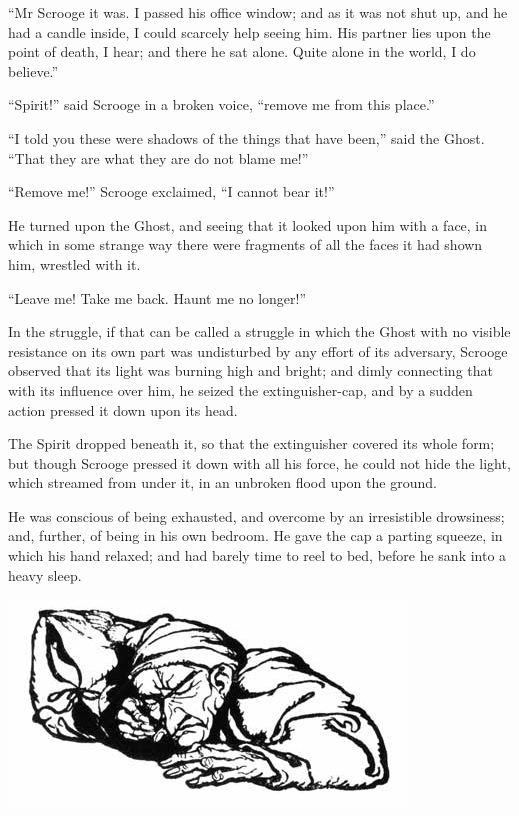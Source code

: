 \documentclass[paper=5.5in:8.5in,BCOR=10mm,twoside,DIV=15,12pt,usegeometry,openany]{scrbook} %
\begin{document}
\enquote{Mr Scrooge it was. I passed his office window; and as it was not shut up, and he had a candle inside, I could scarcely help seeing him. His partner lies upon the point of death, I hear; and there he sat alone. Quite alone in the world, I do believe.}

\enquote{Spirit!} said Scrooge in a broken voice, \enquote{remove me from this place.}

\enquote{I told you these were shadows of the things that have been,} said the Ghost. \enquote{That they are what they are do not blame me!}

\enquote{Remove me!} Scrooge exclaimed, \enquote{I cannot bear it!}

He turned upon the Ghost, and seeing that it looked upon him with a face, in which in some strange way there were fragments of all the faces it had shown him, wrestled with it.

\enquote{Leave me! Take me back. Haunt me no longer!}

In the struggle, if that can be called a struggle in which the Ghost with no visible resistance on its own part was undisturbed by any effort of its adversary, Scrooge observed that its light was burning high and bright; and dimly connecting that with its influence over him, he seized the extinguisher-cap, and by a sudden action pressed it down upon its head.



The Spirit dropped beneath it, so that the extinguisher covered its whole form; but though Scrooge pressed it down with all his force, he could not hide the light, which streamed from under it, in an unbroken flood upon the ground.

He was conscious of being exhausted, and overcome by an irresistible drowsiness; and, further, of being in his own bedroom. He gave the cap a parting squeeze, in which his hand relaxed; and had barely time to reel to bed, before he sank into a heavy sleep.

\begin{minipage}[c]{\linewidth}
\includegraphics[width=\linewidth]{gs090}
\end{minipage}
\end{document}

